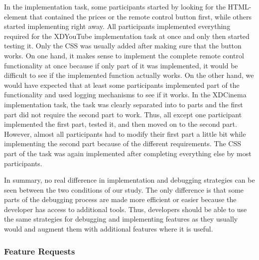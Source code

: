 In the implementation task, some participants started by looking for the HTML-element that contained the prices or the remote control button first, while others started implementing right away. All participants implemented everything required for the XDYouTube implementation task at once and only then started testing it. Only the CSS was usually added after making sure that the button works. On one hand, it makes sense to implement the complete remote control functionality at once because if only part of it was implemented, it would be difficult to see if the implemented function actually works. On the other hand, we would have expected that at least some participants implemented part of the functionality and used logging mechanisms to see if it works. In the XDCinema implementation task, the task was clearly separated into to parts and the first part did not require the second part to work. Thus, all except one participant implemented the first part, tested it, and then moved on to the second part. However, almost all participants had to modify their first part a little bit while implementing the second part because of the different requirements. The CSS part of the task was again implemented after completing everything else by most participants.

In summary, no real difference in implementation and debugging strategies can be seen between the two conditions of our study. The only difference is that some parts of the debugging process are made more efficient or easier because the developer has access to additional tools. Thus, developers should be able to use the same strategies for debugging and implementing features as they usually would and augment them with additional features where it is useful. 

\subsubsection{Feature Requests}

